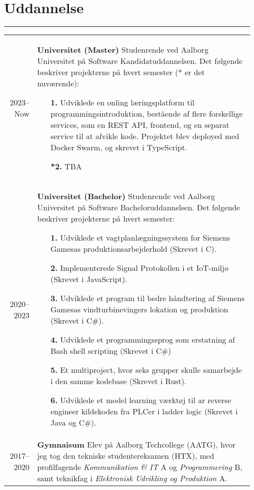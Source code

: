 \documentclass[a4paper]{report}
\def\secsep{\hrule width5cm}
\begin{document}
\newcommand{\p}[1]{\textbf{#1}\mbox{}\newline}
\def\n{\\\\}
\section*{Uddannelse}
\secsep
\begin{longtabu} to \textwidth {r|X}
    2023--Now & \p{Universitet (Master)}
    Studenrende ved Aalborg Universitet på Software Kandidatuddannelsen. Det følgende beskriver projekterne på hvert semester (* er det nuværende):
    \begin{itemize}[leftmargin=4em]
        \item[\textbf{1.}] Udviklede en onling læringsplatform til programmingsintroduktion, bestående af flere forskellige services, som en REST API, frontend, og en separat service til at afvikle kode.
            Projektet blev deployed med Docker Swarm, og skrevet i TypeScript.
        \item[\textbf{*2.}] TBA
    \end{itemize}
    \\
    2020--2023 & \p{Universitet (Bachelor)}
    Studenrende ved Aalborg Universitet på Software Bacheloruddannelsen. Det følgende beskriver projekterne på hvert semester:
    \begin{itemize}[leftmargin=4em]
        \item[\textbf{1.}] Udviklede et vagtplanlægningssystem for Siemens Gamesas produktionsarbejderhold (Skrevet i C).
        \item[\textbf{2.}] Implementerede Signal Protokollen i et IoT-miljø (Skrevet i JavaScript).
        \item[\textbf{3.}] Udviklede et program til bedre håndtering af Siemens Gamesas vindturbinevingers lokation og produktion (Skrevet i C\#).
        \item[\textbf{4.}] Udviklede et programmingssprog som erstatning af Bash shell scripting (Skrevet i C\#)
        \item[\textbf{5.}] Et multiproject, hvor seks grupper skulle samarbejde i den samme kodebase (Skrevet i Rust).
        \item[\textbf{6.}] Udviklede et model learning værktøj til ar reverse engineer kildekoden fra PLCer i ladder logic (Skrevet i Java og C\#).
    \end{itemize}
    \\
    2017--2020 & \p{Gymnaisum} 
    Elev på Aalborg Techcollege (AATG), hvor jeg tog den tekniske studentereksamen (HTX),
    med profilfagende \textit{Kommunikation \& IT} A og \textit{Programmering} B,
    samt teknikfag i \textit{Elektronisk Udvikling og Produktion} A.
\end{longtabu}
\end{document}
